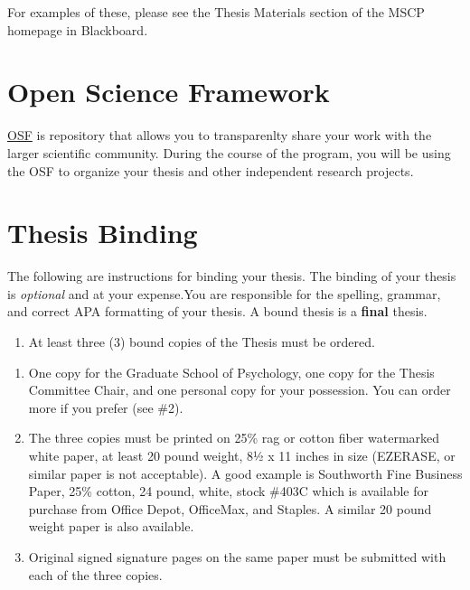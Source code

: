 \documentclass[]{book}
\providecommand{\tightlist}{%
  \setlength{\itemsep}{0pt}\setlength{\parskip}{0pt}}
\begin{document}
For examples of these, please see the Thesis Materials section of the MSCP homepage in Blackboard.

\hypertarget{open-science-framework}{%
\chapter{Open Science Framework}\label{open-science-framework}}

\href{https://osf.io/}{OSF} is repository that allows you to transparenlty share your work with the larger scientific community. During the course of the program, you will be using the OSF to organize your thesis and other independent research projects.

\hypertarget{thesis-binding}{%
\chapter{Thesis Binding}\label{thesis-binding}}

The following are instructions for binding your thesis. The binding of your thesis is \emph{optional} and at your expense.You are responsible for the spelling, grammar, and correct APA formatting of your thesis. A bound thesis is a \textbf{final} thesis.

\begin{enumerate}
\def\labelenumi{\arabic{enumi}.}
\tightlist
\item
  At least three (3) bound copies of the Thesis must be ordered.
\end{enumerate}

\begin{enumerate}
\def\labelenumi{\alph{enumi}.}
\tightlist
\item
  One copy for the Graduate School of Psychology, one copy for the Thesis Committee Chair, and one personal copy for your possession. You can order more if you prefer (see \#2).
\item
  The three copies must be printed on 25\% rag or cotton fiber watermarked white paper, at least 20 pound weight, 8½ x 11 inches in size (EZERASE, or similar paper is not acceptable). A good example is Southworth Fine Business Paper, 25\% cotton, 24 pound, white, stock \#403C which is available for purchase from Office Depot, OfficeMax, and Staples. A similar 20 pound weight paper is also available.
\item
  Original signed signature pages on the same paper must be submitted with each of the three copies.
\end{enumerate}
\end{document}
